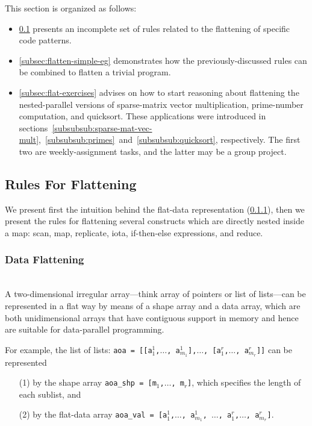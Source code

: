 \documentclass[acmsmall,review]{acmart}\settopmatter{printfolios=true,printccs=false,printacmref=false}
\begin{document}
This section is organized as follows:
\begin{itemize}
    \item \cref{subsec:flatten-rules} presents an incomplete set of 
        rules related to the flattening of specific code patterns.
    \item \cref{subsec:flatten-simple-eg} demonstrates how the 
        previously-discussed rules can be combined to flatten a 
        trivial program.
    \item \cref{subsec:flat-exercises} advises on how to start
        reasoning about flattening the nested-parallel versions
        of sparse-matrix vector multiplication, prime-number computation,
        and quicksort. These applications were introduced in
        sections~\ref{subsubsub:sparse-mat-vec-mult},~\ref{subsubsub:primes}~and~\ref{subsubsub:quicksort},
        respectively. The first two are weekly-assignment tasks,
        and the latter may be a group project.
\end{itemize}

\subsection{Rules For Flattening}
\label{subsec:flatten-rules}

We present first the intuition behind the flat-data representation
(\cref{subsubsec:data-flat}), then we present the rules for flattening
several constructs which are directly nested inside a map:
scan, map, replicate, iota, if-then-else expressions, and reduce. 

\subsubsection{Data Flattening}
\label{subsubsec:data-flat}
$\mbox{ }$\\

A two-dimensional irregular array---think array of pointers or 
list of lists---can be represented in a flat way by means of
a shape array and a data array, which are both unidimensional
arrays that have contiguous support in memory and hence are
suitable for data-parallel programming. 

For example, the list of lists:
{\tt aoa = [[a$^{1}_{1}$,$\ldots$, a$^{1}_{m{_1}}$],$\ldots$, [a$^{r}_{1}$,$\ldots$, a$^{r}_{m{_r}}$]]}
can be represented 
\begin{itemize}
    \item[(1)] by the shape array {\tt aoa\_shp = [m$_1$,$\ldots$, m$_r$]}, which specifies the length
            of each sublist, and
    \item[(2)] by the flat-data array
    {\tt aoa\_val = [a$^{1}_{1}$,$\ldots$, a$^{1}_{m{_1}}$, $\ldots$, a$^{r}_{1}$,$\ldots$, a$^{r}_{m{_r}}$]}.
\end{itemize}
\end{document}
